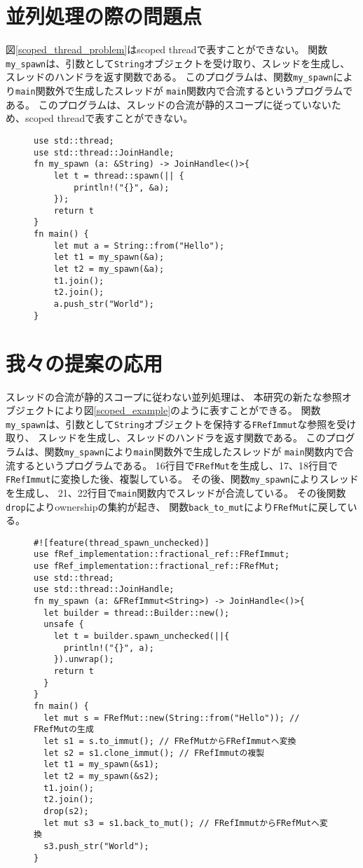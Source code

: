 \documentclass{sumiilab-paper}
\theoremstyle{mystyle}
\numberwithin{definition}{chapter} %
\begin{document}
\section{並列処理の際の問題点}
図\ref{scoped_thread_problem}はscoped threadで表すことができない。
関数\texttt{my\_spawn}は、引数として\texttt{String}オブジェクトを受け取り、スレッドを生成し、
スレッドのハンドラを返す関数である。
このプログラムは、関数\texttt{my\_spawn}により\texttt{main}関数外で生成したスレッドが
\texttt{main}関数内で合流するというプログラムである。
このプログラムは、スレッドの合流が静的スコープに従っていないため、scoped threadで表すことができない。
\begin{figure}[htp]
\begin{lstlisting}[caption=scoped threadで表せない例, 
  label=scoped_thread_problem, captionpos=b]
use std::thread;
use std::thread::JoinHandle;
fn my_spawn (a: &String) -> JoinHandle<()>{
    let t = thread::spawn(|| {
        println!("{}", &a);
    });
    return t
}
fn main() {
    let mut a = String::from("Hello");
    let t1 = my_spawn(&a);
    let t2 = my_spawn(&a);
    t1.join();
    t2.join();
    a.push_str("World");
}
\end{lstlisting}
\end{figure}

\section{我々の提案の応用}
スレッドの合流が静的スコープに従わない並列処理は、
本研究の新たな参照オブジェクトにより図\ref{scoped_example}のように表すことができる。
関数\texttt{my\_spawn}は、引数として\texttt{String}オブジェクトを保持する\texttt{FRefImmut}な参照を受け取り、
スレッドを生成し、スレッドのハンドラを返す関数である。
このプログラムは、関数\texttt{my\_spawn}により\texttt{main}関数外で生成したスレッドが
\texttt{main}関数内で合流するというプログラムである。
16行目で\texttt{FRefMut}を生成し、17、18行目で\texttt{FRefImmut}に変換した後、複製している。
その後、関数\texttt{my\_spawn}によりスレッドを生成し、
21、22行目で\texttt{main}関数内でスレッドが合流している。
その後関数\texttt{drop}によりownershipの集約が起き、
関数\texttt{back\_to\_mut}により\texttt{FRefMut}に戻している。
\begin{figure}[htp]
\begin{lstlisting}[caption=新たな参照オブジェクトを用いた並列処理の例, 
  label=scoped_example, captionpos=b]
#![feature(thread_spawn_unchecked)]
use fRef_implementation::fractional_ref::FRefImmut;
use fRef_implementation::fractional_ref::FRefMut;
use std::thread;
use std::thread::JoinHandle;
fn my_spawn (a: &FRefImmut<String>) -> JoinHandle<()>{
  let builder = thread::Builder::new();
  unsafe {
    let t = builder.spawn_unchecked(||{
      println!("{}", a);
    }).unwrap();
    return t
  }
}
fn main() {
  let mut s = FRefMut::new(String::from("Hello")); // FRefMutの生成
  let s1 = s.to_immut(); // FRefMutからFRefImmutへ変換
  let s2 = s1.clone_immut(); // FRefImmutの複製
  let t1 = my_spawn(&s1);
  let t2 = my_spawn(&s2); 
  t1.join();
  t2.join();
  drop(s2);
  let mut s3 = s1.back_to_mut(); // FRefImmutからFRefMutへ変換
  s3.push_str("World");
}
\end{lstlisting}
\end{figure}
\end{document}
